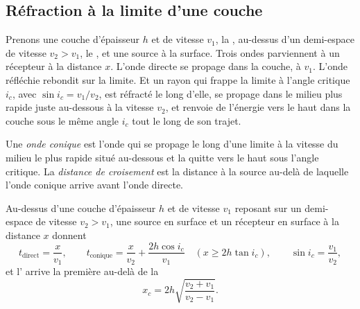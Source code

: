 \subsection{Réfraction à la limite d'une couche}

Prenons une couche d'épaisseur $h$ et de vitesse $v_1$, la , au-dessus d'un
demi-espace de vitesse $v_2 > v_1$, le , et une source à la surface. Trois
ondes parviennent à un récepteur à la distance $x$. L'onde directe se propage dans
la couche, à $v_1$. L'onde réfléchie rebondit sur la limite. Et un rayon qui
frappe la limite à l'angle critique $i_c$, avec $\sin i_c = v_1/v_2$, est
réfracté le long d'elle, se propage dans le milieu plus rapide juste au-dessous à
la vitesse $v_2$, et renvoie de l'énergie vers le haut dans la couche sous le même
angle $i_c$ tout le long de son trajet.

\begin{definition}\label{def:b1:layered-earth:head-wave}
Une \emph{onde conique} est l'onde qui se propage le long d'une limite à la
vitesse du milieu le plus rapide situé au-dessous et la quitte vers le haut sous
l'angle critique. La \emph{distance de croisement} est la distance à la source au-delà
de laquelle l'onde conique arrive avant l'onde directe.
\end{definition}

\begin{theorem}\label{thm:b1:layered-earth:two-layer}
Au-dessus d'une couche d'épaisseur $h$ et de vitesse $v_1$ reposant sur un
demi-espace de vitesse $v_2 > v_1$, une source en surface et un récepteur en
surface à la distance $x$ donnent
\[
  t_{\text{direct}} = \frac{x}{v_1}, \qquad
  t_{\text{conique}} = \frac{x}{v_2} + \frac{2h\cos i_c}{v_1}
  \quad (x \ge 2h\tan i_c), \qquad \sin i_c = \frac{v_1}{v_2},
\]
et l' arrive la première au-delà de la 
\[
  x_c = 2h\sqrt{\frac{v_2 + v_1}{v_2 - v_1}}.
\]
\end{theorem}

